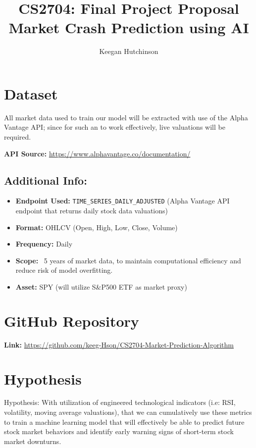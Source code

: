 \documentclass[runningheads]{llncs}
\title{CS2704: Final Project Proposal \\ Market Crash Prediction using AI}
\author{Keegan Hutchinson}
\institute{University of New Brunswick Saint John}
\begin{document}
\maketitle

\section*{Dataset}

All market data used to train our model will be extracted with use of the Alpha Vantage API; since for such an to work effectively, live valuations will be required. 

\vspace{1.0em}

\textbf{API Source:} \url{https://www.alphavantage.co/documentation/}


\subsection*{Additional Info:}
\begin{itemize}
  \item \textbf {Endpoint Used:} \texttt{TIME\_SERIES\_DAILY\_ADJUSTED} (Alpha Vantage API endpoint that returns daily stock data valuations)
  \item \textbf {Format:} OHLCV (Open, High, Low, Close, Volume)
  \item  \textbf {Frequency:} Daily
  \item  \textbf {Scope:} ~5 years of market data, to maintain computational efficiency and reduce risk of model overfitting.
  \item  \textbf {Asset:} SPY (will utilize S\&P500 ETF as market proxy)
\end{itemize}

\section*{GitHub Repository}
\textbf{Link:} \url{https://github.com/keeg-Hson/CS2704-Market-Prediction-Algorithm}

\section*{Hypothesis}
Hypothesis: With utilization of engineered technological indicators (i.e: RSI, volatility, moving average valuations), that we can cumulatively use these metrics to train a machine learning model that will effectively be able to predict future stock market behaviors and identify early warning signs of short-term stock market downturns.
\end{document}
